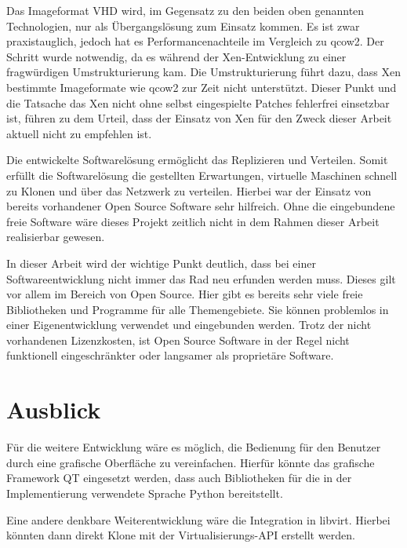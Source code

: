 Das Imageformat VHD wird, im Gegensatz zu den beiden oben genannten Technologien, nur als Übergangslösung zum Einsatz kommen. Es ist zwar praxistauglich, jedoch hat es Performancenachteile im Vergleich zu qcow2. Der Schritt wurde notwendig, da es während der Xen-Entwicklung zu einer fragwürdigen Umstrukturierung kam. Die Umstrukturierung führt dazu, dass Xen bestimmte Imageformate wie qcow2 zur Zeit nicht unterstützt. Dieser Punkt und die Tatsache das Xen nicht ohne selbst eingespielte Patches fehlerfrei einsetzbar ist, führen zu dem Urteil, dass der Einsatz von Xen für den Zweck dieser Arbeit aktuell nicht zu empfehlen ist.
{ \fontsize{11.9pt}{14.3pt}\selectfont
Die entwickelte Softwarelösung ermöglicht das Replizieren und Verteilen. Somit erfüllt die Softwarelösung die gestellten Erwartungen, virtuelle Maschinen schnell zu Klonen und über das Netzwerk zu verteilen. Hierbei war der Einsatz von bereits vorhandener Open Source Software sehr hilfreich. Ohne die eingebundene freie Software wäre dieses Projekt zeitlich nicht in dem Rahmen dieser Arbeit realisierbar gewesen.

In dieser Arbeit wird der wichtige Punkt deutlich, dass bei einer Softwareentwicklung nicht immer das Rad neu erfunden werden muss. Dieses gilt vor allem im Bereich von Open Source. Hier gibt es bereits sehr viele freie Bibliotheken und Programme für alle Themengebiete. Sie können problemlos in einer Eigenentwicklung verwendet und eingebunden werden. Trotz der nicht vorhandenen Lizenzkosten, ist Open Source Software in der Regel nicht funktionell eingeschränkter oder langsamer als proprietäre Software.

\section{Ausblick}
Für die weitere Entwicklung wäre es möglich, die Bedienung für den Benutzer durch eine grafische Oberfläche zu vereinfachen. Hierfür könnte das grafische Framework QT eingesetzt werden, dass auch Bibliotheken für die in der Implementierung verwendete Sprache Python bereitstellt. }

Eine andere denkbare Weiterentwicklung wäre die Integration in libvirt. Hierbei könnten dann direkt Klone mit der Virtualisierungs-API erstellt werden.